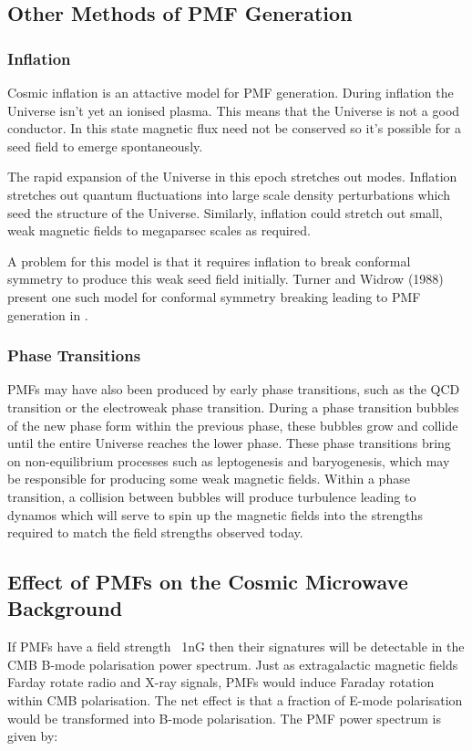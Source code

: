 \subsection{Other Methods of PMF Generation}

\subsubsection*{Inflation}
Cosmic inflation is an attactive model for PMF generation. During inflation the Universe isn't yet an ionised plasma. This means that the Universe is not a good conductor. In this state magnetic flux need not be conserved so it's possible for a seed field to emerge spontaneously.

The rapid expansion of the Universe in this epoch stretches out modes. Inflation stretches out quantum fluctuations into large scale density perturbations which seed the structure of the Universe. Similarly, inflation could stretch out small, weak magnetic fields to megaparsec scales as required.

A problem for this model is that it requires inflation to break conformal symmetry to produce this weak seed field initially. Turner and Widrow (1988) present one such model for conformal symmetry breaking leading to PMF generation in \cite{PhysRevD.37.2743}.
\\
\subsubsection*{Phase Transitions}
PMFs may have also been produced by early phase transitions, such as the QCD transition or the electroweak phase transition. During a phase transition bubbles of the new phase form within the previous phase, these bubbles grow and collide until the entire Universe reaches the lower phase. These phase transitions bring on non-equilibrium processes such as leptogenesis and baryogenesis, which may be responsible for producing some weak magnetic fields. Within a phase transition, a collision between bubbles will produce turbulence leading to dynamos which will serve to spin up the magnetic fields into the strengths required to match the field strengths observed today.

\subsection{Effect of PMFs on the Cosmic Microwave Background}
If PMFs have a field strength ~1nG then their signatures will be detectable in the CMB B-mode polarisation power spectrum. Just as extragalactic magnetic fields Farday rotate radio and X-ray signals, PMFs would induce Faraday rotation within CMB polarisation. The net effect is that a fraction of E-mode polarisation would be transformed into B-mode polarisation. 
The PMF power spectrum is given by:

